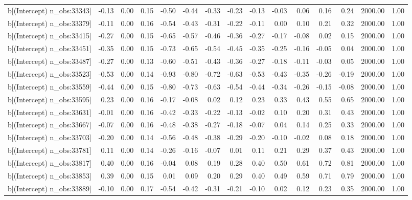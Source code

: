 \begin{table}[ht]
\begin{tabular}{rrrrrrrrrrrrrrr}
  b[(Intercept) n\_obs:33343] & -0.13 & 0.00 & 0.15 & -0.50 & -0.44 & -0.33 & -0.23 & -0.13 & -0.03 & 0.06 & 0.16 & 0.24 & 2000.00 & 1.00 \\ 
  b[(Intercept) n\_obs:33379] & -0.11 & 0.00 & 0.16 & -0.54 & -0.43 & -0.31 & -0.22 & -0.11 & 0.00 & 0.10 & 0.21 & 0.32 & 2000.00 & 1.00 \\ 
  b[(Intercept) n\_obs:33415] & -0.27 & 0.00 & 0.15 & -0.65 & -0.57 & -0.46 & -0.36 & -0.27 & -0.17 & -0.08 & 0.02 & 0.15 & 2000.00 & 1.00 \\ 
  b[(Intercept) n\_obs:33451] & -0.35 & 0.00 & 0.15 & -0.73 & -0.65 & -0.54 & -0.45 & -0.35 & -0.25 & -0.16 & -0.05 & 0.04 & 2000.00 & 1.00 \\ 
  b[(Intercept) n\_obs:33487] & -0.27 & 0.00 & 0.13 & -0.60 & -0.51 & -0.43 & -0.36 & -0.27 & -0.18 & -0.11 & -0.03 & 0.05 & 2000.00 & 1.00 \\ 
  b[(Intercept) n\_obs:33523] & -0.53 & 0.00 & 0.14 & -0.93 & -0.80 & -0.72 & -0.63 & -0.53 & -0.43 & -0.35 & -0.26 & -0.19 & 2000.00 & 1.00 \\ 
  b[(Intercept) n\_obs:33559] & -0.44 & 0.00 & 0.15 & -0.80 & -0.73 & -0.63 & -0.54 & -0.44 & -0.34 & -0.26 & -0.15 & -0.08 & 2000.00 & 1.00 \\ 
  b[(Intercept) n\_obs:33595] & 0.23 & 0.00 & 0.16 & -0.17 & -0.08 & 0.02 & 0.12 & 0.23 & 0.33 & 0.43 & 0.55 & 0.65 & 2000.00 & 1.00 \\ 
  b[(Intercept) n\_obs:33631] & -0.01 & 0.00 & 0.16 & -0.42 & -0.33 & -0.22 & -0.13 & -0.02 & 0.10 & 0.20 & 0.31 & 0.43 & 2000.00 & 1.00 \\ 
  b[(Intercept) n\_obs:33667] & -0.07 & 0.00 & 0.16 & -0.48 & -0.38 & -0.27 & -0.18 & -0.07 & 0.04 & 0.14 & 0.25 & 0.33 & 2000.00 & 1.00 \\ 
  b[(Intercept) n\_obs:33703] & -0.20 & 0.00 & 0.14 & -0.56 & -0.48 & -0.38 & -0.29 & -0.20 & -0.10 & -0.02 & 0.08 & 0.18 & 2000.00 & 1.00 \\ 
  b[(Intercept) n\_obs:33781] & 0.11 & 0.00 & 0.14 & -0.26 & -0.16 & -0.07 & 0.01 & 0.11 & 0.21 & 0.29 & 0.37 & 0.43 & 2000.00 & 1.00 \\ 
  b[(Intercept) n\_obs:33817] & 0.40 & 0.00 & 0.16 & -0.04 & 0.08 & 0.19 & 0.28 & 0.40 & 0.50 & 0.61 & 0.72 & 0.81 & 2000.00 & 1.00 \\ 
  b[(Intercept) n\_obs:33853] & 0.39 & 0.00 & 0.15 & 0.01 & 0.09 & 0.20 & 0.29 & 0.40 & 0.49 & 0.59 & 0.71 & 0.79 & 2000.00 & 1.00 \\ 
  b[(Intercept) n\_obs:33889] & -0.10 & 0.00 & 0.17 & -0.54 & -0.42 & -0.31 & -0.21 & -0.10 & 0.02 & 0.12 & 0.23 & 0.35 & 2000.00 & 1.00 \\ 

\end{tabular}
\end{table}
